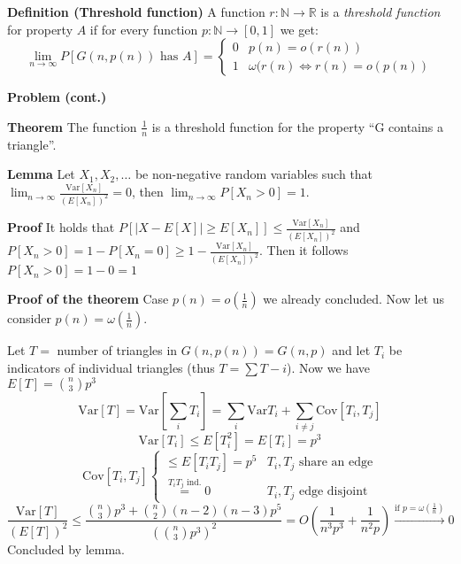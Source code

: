 \documentclass[a4paper]{article}
\begin{document}
\textbf{Definition (Threshold function)}
A function $r: \mathbb{N} \rightarrow \mathbb{R}$ is a \emph{threshold function} for property $A$ if for every function $p: \mathbb{N} \rightarrow [0,1]$ we get:
$$\lim_{n \rightarrow \infty} P[G(n, p(n)) \text{ has } A] = \begin{cases}
	0 & p(n) = o(r(n)) \\
	1 & \omega(r(n) \Leftrightarrow r(n) = o(p(n))
\end{cases}$$

\textbf{Problem (cont.)}

\textbf{Theorem}
The function $\frac{1}{n}$ is a threshold function for the property ``G contains a triangle''.

\textbf{Lemma}
Let $X_1, X_2, \ldots$ be non-negative random variables such that $\lim_{n \rightarrow \infty} \frac{\text{Var}[X_n]}{(E[X_n])^2} = 0$, then $\lim_{n \rightarrow \infty} P[X_n > 0] = 1$.

\textbf{Proof}
It holds that $P[|X - E[X]| \geq E[X_n]] \leq \frac{\text{Var}[X_n]}{(E[X_n])^2}$ and $P[X_n > 0] = 1-P[X_n = 0] \geq 1 - \frac{\text{Var}[X_n]}{(E[X_n])^2}$.
Then it follows $P[X_n > 0] = 1 - 0 = 1$

\textbf{Proof of the theorem}
Case $p(n) = o(\frac{1}{n})$ we already concluded.
Now let us consider $p(n) = \omega(\frac{1}{n})$.

Let $T =$ number of triangles in $G(n,p(n)) = G(n,p)$ and let $T_i$ be indicators of individual triangles (thus $T = \sum T-i$).
Now we have $E[T] = {n \choose 3} p^3$
$$\text{Var}[T] = \text{Var}[\sum_i T_i] = \sum_i \text{Var} T_i + \sum_{i \neq j} \text{Cov}[T_i, T_j]$$
$$\text{Var}[T_i] \leq E[T_i^2] = E[T_i] = p^3$$
$$\text{Cov}[T_i, T_j] \begin{cases}
	\leq E[T_i T_j] = p^5 & T_i, T_j \text{ share an edge} \\
	\stackrel{T_iT_j \text{ ind.}}{=} 0 & T_i, T_j \text{ edge disjoint}
\end{cases}$$
$$\frac{\text{Var}[T]}{(E[T])^2} \leq \frac{{n \choose 3} p^3 + {n \choose 2}(n-2)(n-3)p^5}{\left({n \choose 3} p^3\right)^2} = O\left(\frac{1}{n^3p^3} + \frac{1}{n^2p}\right) \stackrel{\text{if } p = \omega\left(\frac{1}{n}\right)}{\rightarrow} 0$$
Concluded by lemma.
\end{document}
